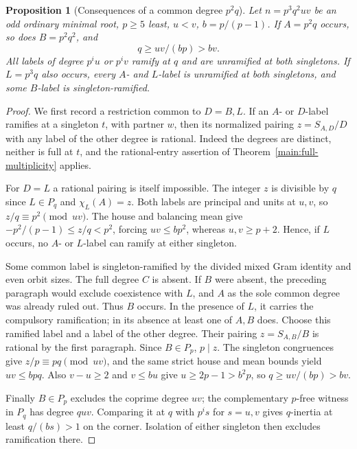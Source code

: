 \documentclass[11pt,a4paper]{article}
\numberwithin{equation}{section}
\newtheorem{proposition}[theorem]{Proposition}
\theoremstyle{remark}
\begin{document}
\begin{proposition}[Consequences of a common degree $p^2q$]\label{fam:M:12.6}\label{new:common-A}
Let $n=p^3q^2uv$ be an odd ordinary minimal root, $p\ge5$ least,
$u<v$, $b=p/(p-1)$. If $A=p^2q$ occurs, so does $B=p^2q^2$, and
\[
                  q\ge uv/(bp)>bv .
\]
All labels of degree $p^iu$ or $p^iv$ ramify at $q$ and are unramified
at both singletons. If $L=p^3q$ also occurs, every $A$- and $L$-label
is unramified at both singletons, and some $B$-label is singleton-ramified.
\end{proposition}
\begin{proof}
We first record a restriction common to $D=B,L$. If an $A$- or $D$-label
ramifies at a singleton $t$, with partner $w$, then its normalized
pairing $z=S_{A,D}/D$ with any label of the other degree is rational.
Indeed the degrees are distinct, neither is full at $t$, and the
rational-entry assertion of Theorem~\ref{main:full-multiplicity} applies.

For $D=L$ a rational pairing is itself impossible. The integer $z$ is
divisible by $q$ since $L\in P_q$ and $\chi_L(A)=z$. Both labels
are principal and units at $u,v$, so $z/q\equiv p^2\pmod{uv}$.
The house and balancing mean give $-p^2/(p-1)\le z/q<p^2$, forcing
$uv\le bp^2$, whereas $u,v\ge p+2$. Hence, if $L$ occurs, no
$A$- or $L$-label can ramify at either singleton.

Some common label is singleton-ramified by the divided mixed Gram
identity and even orbit sizes. The full degree $C$ is absent. If $B$
were absent, the preceding paragraph would exclude coexistence with
$L$, and $A$ as the sole common degree was already ruled out. Thus
$B$ occurs. In the presence of $L$, it carries the compulsory ramification;
in its absence at least one of $A,B$ does. Choose this ramified label and
a label of the other degree. Their pairing $z=S_{A,B}/B$ is rational by
the first paragraph. Since $B\in P_p$, $p\mid z$. The singleton congruences give $z/p\equiv pq\pmod{uv}$, and the same strict house
and mean bounds yield $uv\le bpq$. Also $v-u\ge2$ and $v\le bu$
give $u\ge2p-1>b^2p$, so $q\ge uv/(bp)>bv$.

Finally $B\in P_p$ excludes the coprime degree $uv$; the complementary
$p$-free witness in $P_q$ has degree $quv$. Comparing it at $q$ with
$p^is$ for $s=u,v$ gives $q$-inertia at least $q/(bs)>1$ on the
corner. Isolation of either singleton then excludes ramification
there.

\end{proof}
\end{document}
